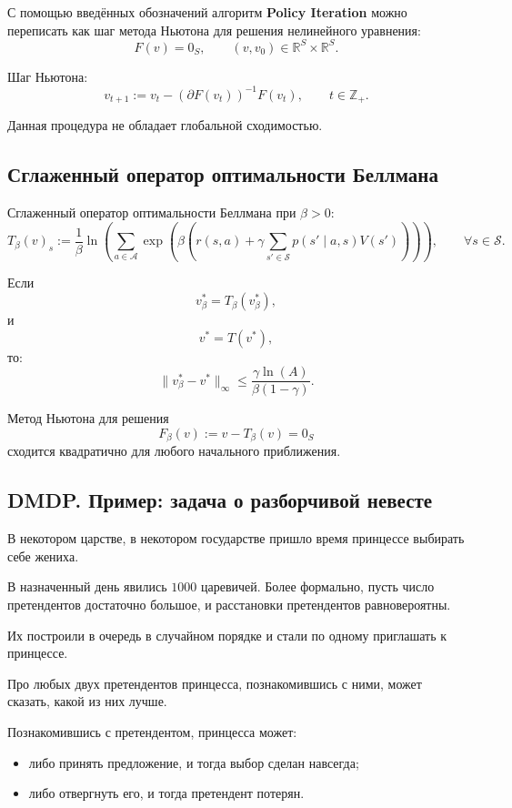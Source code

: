 \documentclass[12pt,a4paper]{article}
\begin{document}
С помощью введённых обозначений алгоритм \textbf{Policy Iteration} можно переписать как шаг метода Ньютона для решения нелинейного уравнения:
\[
F(v) = 0_S,
\qquad
(v,v_0) \in \mathbb R^S \times \mathbb R^S.
\]

Шаг Ньютона:
\[
v_{t+1}
:=
v_t
-
\left(
\partial F(v_t)
\right)^{-1}
F(v_t),
\qquad
t \in \mathbb Z_+.
\]

Данная процедура не обладает глобальной сходимостью.

\subsection{Сглаженный оператор оптимальности Беллмана}

Сглаженный оператор оптимальности Беллмана при $\beta>0$:
\[
T_\beta(v)_s
:=
\frac{1}{\beta}
\ln
\left(
\sum_{a \in \mathcal A}
\exp
\left(
\beta
\left(
r(s,a)
+
\gamma
\sum_{s' \in \mathcal S}
p(s'\mid a,s)V(s')
\right)
\right)
\right),
\qquad
\forall s \in \mathcal S.
\]

Если
\[
v_\beta^\ast = T_\beta(v_\beta^\ast),
\]
и
\[
v^\ast = T(v^\ast),
\]
то:
\[
\|v_\beta^\ast - v^\ast\|_\infty
\le
\frac{\gamma \ln(A)}
{\beta(1-\gamma)}.
\]

Метод Ньютона для решения
\[
F_\beta(v)
:=
v-T_\beta(v)
=
0_S
\]
сходится квадратично для любого начального приближения.

\subsection{DMDP. Пример: задача о разборчивой невесте}

В некотором царстве, в некотором государстве пришло время принцессе выбирать себе жениха.

В назначенный день явились $1000$ царевичей. Более формально, пусть число претендентов достаточно большое, и расстановки претендентов равновероятны.

Их построили в очередь в случайном порядке и стали по одному приглашать к принцессе.

Про любых двух претендентов принцесса, познакомившись с ними, может сказать, какой из них лучше.

Познакомившись с претендентом, принцесса может:
\begin{itemize}
    \item либо принять предложение, и тогда выбор сделан навсегда;
    \item либо отвергнуть его, и тогда претендент потерян.
\end{itemize}
\end{document}
